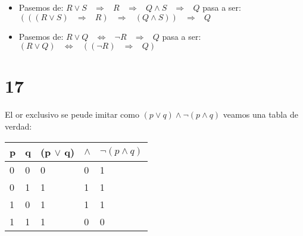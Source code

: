 \documentclass[12pt, fleqn]{article}                            %
\DeclareMathOperator \Space     {\quad}                         %
\DeclareMathOperator \MiniSpace {\;}                            %
\theoremstyle{break}                                            %
\newcommand \lEqual  {\MiniSpace \Leftrightarrow \MiniSpace}    %
\newcommand \lInfire {\MiniSpace \Rightarrow \MiniSpace}        %
\begin{document}
    \begin{itemize}
        \item 
            Pasemos de: $R \vee S \lInfire R \lInfire Q \wedge S \lInfire Q$
            pasa a ser:\\
            $( ( (R \vee S) \lInfire R) \lInfire (Q \wedge S) ) \lInfire Q$

        \item
            Pasemos de: $R \vee Q \lEqual \neg R \lInfire Q$
            pasa a ser:\\
            $(R \vee Q) \lEqual  ((\neg R) \lInfire Q)$    
    \end{itemize}

            
\section{17}    

El or exclusivo se peude imitar como $(p \vee q) \wedge \neg(p \wedge q)$
veamos una tabla de verdad:             \\

\begin{tabular}{|l|l|l|l|l|} 
    \hline
    p & q  & (p $\vee$ q)  &$\wedge$ &$\neg(p \wedge q)$   \\ \hline
    0 & 0  &        0    &    0   & 1     \\ \hline 
    0 & 1  &        1    &    1   & 1    \\ \hline 
    1 & 0  &        1    &    1   & 1     \\ \hline 
    1 & 1  &        1    &    0   & 0     \\ \hline 
\end{tabular}















                
\end{document}
